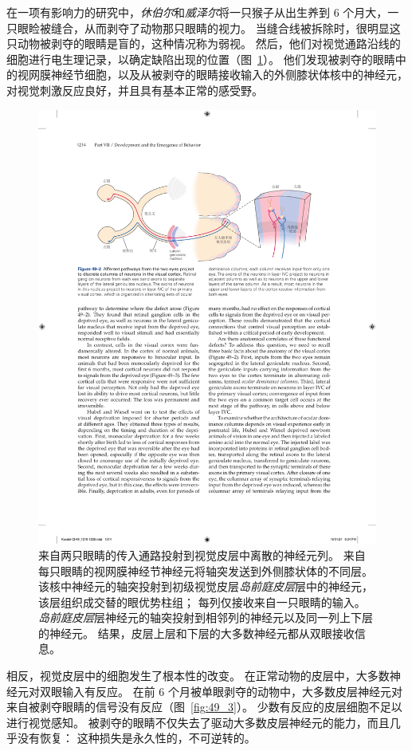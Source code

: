 在一项有影响力的研究中，\textit{休伯尔}和\textit{威泽尔}将一只猴子从出生养到 6 个月大，一只眼睑被缝合，从而剥夺了动物那只眼睛的视力。
当缝合线被拆除时，很明显这只动物被剥夺的眼睛是盲的，这种情况称为弱视。
然后，他们对视觉通路沿线的细胞进行电生理记录，以确定缺陷出现的位置（图~\ref{fig:49_2}）。
他们发现被剥夺的眼睛中的视网膜神经节细胞，以及从被剥夺的眼睛接收输入的外侧膝状体核中的神经元，对视觉刺激反应良好，并且具有基本正常的感受野。


\begin{figure}[htbp]
	\centering
	\includegraphics[width=0.8\linewidth]{chap49/fig_49_2}
	\caption{来自两只眼睛的传入通路投射到视觉皮层中离散的神经元列。
		来自每只眼睛的视网膜神经节神经元将轴突发送到外侧膝状体的不同层。
		该核中神经元的轴突投射到初级视觉皮层\textit{岛前庭皮层}层中的神经元，该层组织成交替的眼优势柱组；
		每列仅接收来自一只眼睛的输入。
		\textit{岛前庭皮层}层神经元的轴突投射到相邻列的神经元以及同一列上下层的神经元。
		结果，皮层上层和下层的大多数神经元都从双眼接收信息。}
	\label{fig:49_2}
\end{figure}


相反，视觉皮层中的细胞发生了根本性的改变。
在正常动物的皮层中，大多数神经元对双眼输入有反应。
在前 6 个月被单眼剥夺的动物中，大多数皮层神经元对来自被剥夺眼睛的信号没有反应（图~\ref{fig:49_3}）。
少数有反应的皮层细胞不足以进行视觉感知。
被剥夺的眼睛不仅失去了驱动大多数皮层神经元的能力，而且几乎没有恢复：
这种损失是永久性的，不可逆转的。


